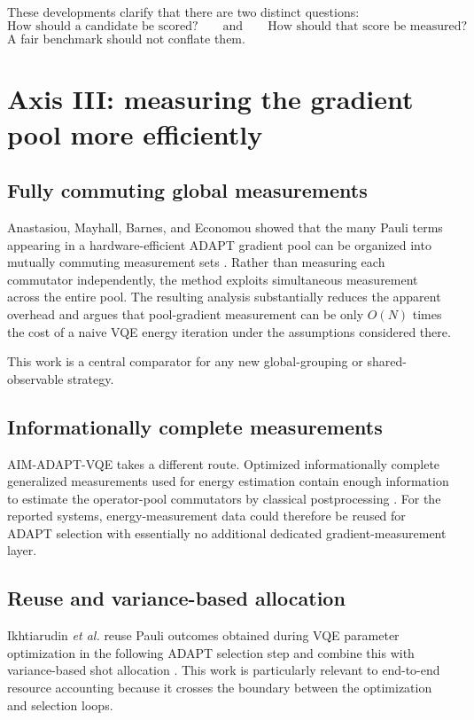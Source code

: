 \documentclass[11pt]{article}
\begin{document}
These developments clarify that there are two distinct questions:
\begin{equation}
    \text{How should a candidate be scored?}
    \qquad\text{and}\qquad
    \text{How should that score be measured?}
\end{equation}
A fair benchmark should not conflate them.

\section{Axis III: measuring the gradient pool more efficiently}

\subsection{Fully commuting global measurements}
Anastasiou, Mayhall, Barnes, and Economou showed that the many Pauli terms appearing in a hardware-efficient ADAPT gradient pool can be organized into mutually commuting measurement sets \cite{Anastasiou2023}. Rather than measuring each commutator independently, the method exploits simultaneous measurement across the entire pool. The resulting analysis substantially reduces the apparent overhead and argues that pool-gradient measurement can be only $O(N)$ times the cost of a naive VQE energy iteration under the assumptions considered there.

This work is a central comparator for any new global-grouping or shared-observable strategy.

\subsection{Informationally complete measurements}
AIM-ADAPT-VQE takes a different route. Optimized informationally complete generalized measurements used for energy estimation contain enough information to estimate the operator-pool commutators by classical postprocessing \cite{Nykanen2025}. For the reported systems, energy-measurement data could therefore be reused for ADAPT selection with essentially no additional dedicated gradient-measurement layer.

\subsection{Reuse and variance-based allocation}
Ikhtiarudin \emph{et al.} reuse Pauli outcomes obtained during VQE parameter optimization in the following ADAPT selection step and combine this with variance-based shot allocation \cite{Ikhtiarudin2025}. This work is particularly relevant to end-to-end resource accounting because it crosses the boundary between the optimization and selection loops.
\end{document}

